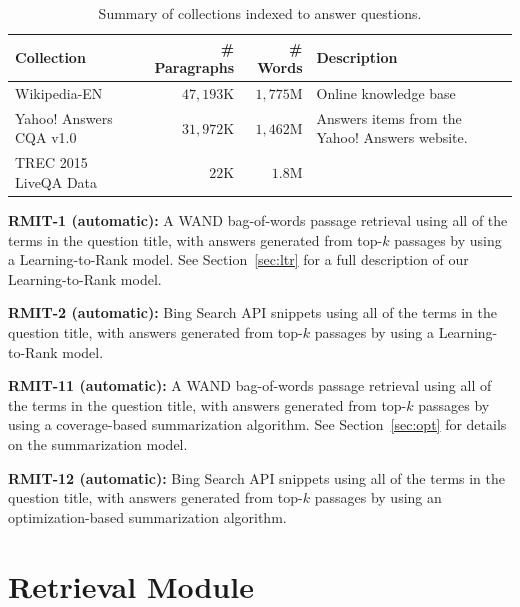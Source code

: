 \documentclass[a4paper,10pt,conference,compsocconf,final]{IEEEtran}
\def\D{\hphantom{1}}
\def\C{\hphantom{1,}}
\begin{document}
\begin{table}[!t]
\centering
\caption{Summary of collections indexed to answer questions.\label{tbl:col}}
\begin{tabular}{p{35mm}rrl}
\toprule
{\bf Collection} & {\bf \# Paragraphs} & {\bf \# Words} & {\bf Description} \\
\midrule
Wikipedia-EN & $47{,}193$K & $1{,}775$M & Online knowledge base \\
Yahoo! Answers CQA v1.0 & $31{,}972$K & $1{,}462$M & Answers items from the Yahoo! Answers website. \\
TREC 2015 LiveQA Data & $22$K & $1.8$M & \\
\bottomrule
\end{tabular}
\end{table}

\noindent\textbf{RMIT-1 (automatic): } A WAND bag-of-words passage
retrieval using all of the terms in the question title, with answers
generated from top-$k$ passages by using a Learning-to-Rank model.
See Section~\ref{sec:ltr} for a full description of our
Learning-to-Rank model.

\medskip

\noindent\textbf{RMIT-2 (automatic): } Bing Search API snippets using
all of the terms in the question title, with answers generated from
top-$k$ passages by using a Learning-to-Rank model.

\medskip

\noindent\textbf{RMIT-11 (automatic): } A WAND bag-of-words passage
retrieval using all of the terms in the question title, with answers
generated from top-$k$ passages by using a coverage-based
summarization algorithm.
See Section~\ref{sec:opt} for details on the summarization model.

\medskip

\noindent\textbf{RMIT-12 (automatic): } Bing Search API snippets
using all of the terms in the question title, with answers generated
from top-$k$ passages by using an optimization-based summarization
algorithm.

\medskip

\section{Retrieval Module}\label{sec:retrieval}
\end{document}
